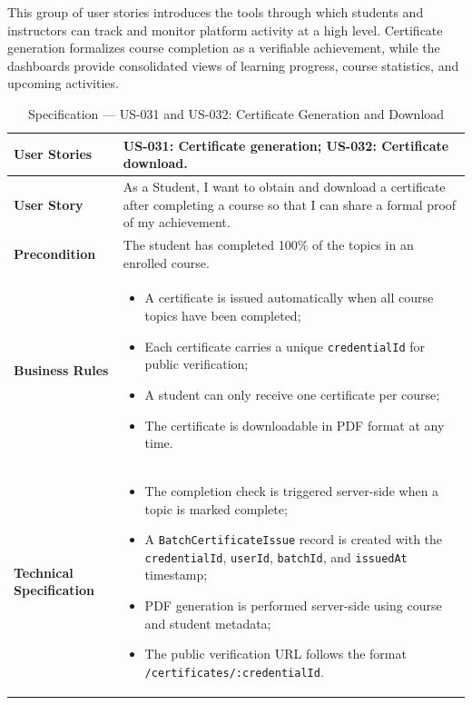 This group of user stories introduces the tools through which students and instructors
can track and monitor platform activity at a high level. Certificate generation
formalizes course completion as a verifiable achievement, while the dashboards provide
consolidated views of learning progress, course statistics, and upcoming activities.

\begin{table}[H]
\centering
\caption{Specification — US-031 and US-032: Certificate Generation and Download}
\label{tab:us031}
\renewcommand{\arraystretch}{1.2}
\begin{tabularx}{\textwidth}{|p{3.5cm}|X|}
\hline
\textbf{User Stories} & US-031: Certificate generation; US-032: Certificate download. \\
\hline
\textbf{User Story} & As a Student, I want to obtain and download a certificate after completing a course so that I can share a formal proof of my achievement. \\
\hline
\textbf{Precondition} & The student has completed 100\% of the topics in an enrolled course. \\
\hline
\textbf{Business Rules} &
\begin{itemize}[noitemsep, topsep=2pt]
  \item A certificate is issued automatically when all course topics have been completed;
  \item Each certificate carries a unique \texttt{credentialId} for public verification;
  \item A student can only receive one certificate per course;
  \item The certificate is downloadable in PDF format at any time.
\end{itemize} \\
\hline
\textbf{Technical Specification} &
\begin{itemize}[noitemsep, topsep=2pt]
  \item The completion check is triggered server-side when a topic is marked complete;
  \item A \texttt{BatchCertificateIssue} record is created with the \texttt{credentialId}, \texttt{userId}, \texttt{batchId}, and \texttt{issuedAt} timestamp;
  \item PDF generation is performed server-side using course and student metadata;
  \item The public verification URL follows the format \texttt{/certificates/:credentialId}.
\end{itemize} \\

\end{tabularx}
\end{table}
